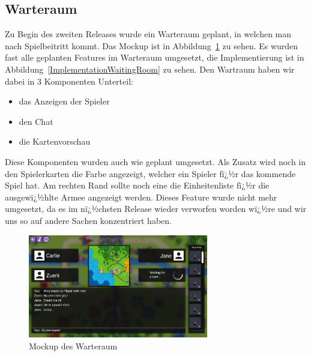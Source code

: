 \documentclass[12pt, titlepage]{scrartcl}
\newcommand{\Abb}[1]{%
	Abbildung\ \ref{#1}%
}
\begin{document}
			\subsection{Warteraum}
			Zu Begin des zweiten Releases wurde ein Warteraum geplant, in welchen man nach Spielbeitritt kommt. Das Mockup ist in \Abb{MockupWaitingRoom} zu sehen. Es wurden fast alle geplanten Features im Warteraum umgesetzt, die Implementierung ist in \Abb{ImplementationWaitingRoom} zu sehen. Den Wartraum haben wir dabei in 3 Komponenten Unterteil:
			\begin{itemize}
				\item das Anzeigen der Spieler
				\item den Chat
				\item die Kartenvorschau
			\end{itemize}
			Diese Komponenten wurden auch wie geplant umgesetzt. Als Zusatz wird noch in den Spielerkarten die Farbe angezeigt, welcher ein Spieler fï¿½r das kommende Spiel hat. Am rechten Rand sollte noch eine die Einheitenliste fï¿½r die ausgewï¿½hlte Armee angezeigt werden. Dieses Feature wurde nicht mehr umgesetzt, da es im nï¿½chsten Release wieder verworfen worden wï¿½re und wir uns so auf andere Sachen konzentriert haben.
			\begin{figure}[H] 
				\centering
				\includegraphics[width=0.7\textwidth]{Waiting_Room_Game_mit_ArmyView.png}
				\caption{Mockup des Warteraum}
				\label{MockupWaitingRoom}
			\end{figure}
			
\end{document}
